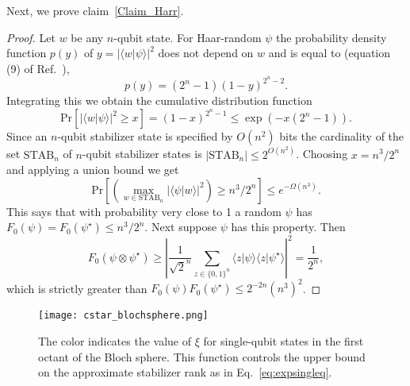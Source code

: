 Next, we prove claim~\ref{Claim_Harr}. \begin{proof}
	Let $w$ be any $n$-qubit state. For Haar-random $\psi$ the probability density function $p(y)$ of $y=|\langle w|\psi\rangle|^2$ does not depend on $w$ and is equal to (equation (9) of Ref.~\cite{random}), 
	\[
	p(y)=(2^n-1)(1-y)^{2^n-2}.
	\]
	Integrating this we obtain the cumulative distribution function
	\[
	\mathrm{Pr}\left[ |\langle w|\psi\rangle|^2\geq x\right]=(1-x)^{2^n-1}\leq \exp(-x(2^{n}-1)).
	\]
	Since an $n$-qubit stabilizer state is specified by $O(n^2)$ bits the cardinality of the set $\mathrm{STAB}_n$ of $n$-qubit stabilizer states is $|\mathrm{STAB}_n|\leq 2^{O(n^2)}$. Choosing $x=n^3/2^n$ and applying a union bound we get
	\[
	\mathrm{Pr} \left[ \left(\max_{w\in \mathrm{STAB}_n} |\langle \psi|w \rangle|^2\right)\geq n^3/2^n\right]\leq e^{-\Omega(n^3)}.
	\]
	This says that with probability very close to 1 a random $\psi$ has $F_0(\psi)=F_0(\psi^{\star})\leq n^3/2^n$. Next suppose $\psi$ has this property. Then
	\[
	F_0(\psi\otimes \psi^{\star})\geq \left|\frac{1}{\sqrt{2}^n}\sum_{z\in \{0,1\}^n} \langle z|\psi\rangle \langle z| \psi^{\star}\rangle \right|^2=\frac{1}{2^n},
	\]
	which is strictly greater than $F_0(\psi)F_0(\psi^{\star})\leq 2^{-2n}(n^3)^2$.
\end{proof}

\begin{figure}[t]
	\centering
	\texttt{[image: cstar\_blochsphere.png]}
	\caption{The color indicates the value of $\xi$ for single-qubit states in the first octant of the Bloch sphere. This function controls the upper bound on the approximate stabilizer rank as in Eq.~\eqref{eq:expsingleq}.}
	\label{fig:cstar1qubit}
\end{figure}


